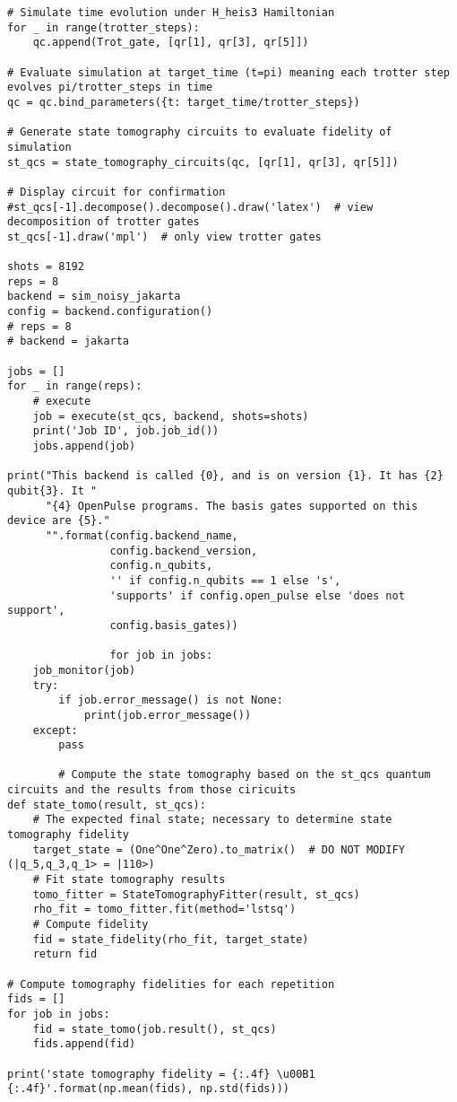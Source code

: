 \begin{verbatim}
# Simulate time evolution under H_heis3 Hamiltonian
for _ in range(trotter_steps):
    qc.append(Trot_gate, [qr[1], qr[3], qr[5]])

# Evaluate simulation at target_time (t=pi) meaning each trotter step evolves pi/trotter_steps in time
qc = qc.bind_parameters({t: target_time/trotter_steps})

# Generate state tomography circuits to evaluate fidelity of simulation
st_qcs = state_tomography_circuits(qc, [qr[1], qr[3], qr[5]])

# Display circuit for confirmation
#st_qcs[-1].decompose().decompose().draw('latex')  # view decomposition of trotter gates
st_qcs[-1].draw('mpl')  # only view trotter gates

shots = 8192
reps = 8
backend = sim_noisy_jakarta
config = backend.configuration()
# reps = 8
# backend = jakarta

jobs = []
for _ in range(reps):
    # execute
    job = execute(st_qcs, backend, shots=shots)
    print('Job ID', job.job_id())
    jobs.append(job)

print("This backend is called {0}, and is on version {1}. It has {2} qubit{3}. It "
      "{4} OpenPulse programs. The basis gates supported on this device are {5}."
      "".format(config.backend_name,
                config.backend_version,
                config.n_qubits,
                '' if config.n_qubits == 1 else 's',
                'supports' if config.open_pulse else 'does not support',
                config.basis_gates))

                for job in jobs:
    job_monitor(job)
    try:
        if job.error_message() is not None:
            print(job.error_message())
    except:
        pass

        # Compute the state tomography based on the st_qcs quantum circuits and the results from those ciricuits
def state_tomo(result, st_qcs):
    # The expected final state; necessary to determine state tomography fidelity
    target_state = (One^One^Zero).to_matrix()  # DO NOT MODIFY (|q_5,q_3,q_1> = |110>)
    # Fit state tomography results
    tomo_fitter = StateTomographyFitter(result, st_qcs)
    rho_fit = tomo_fitter.fit(method='lstsq')
    # Compute fidelity
    fid = state_fidelity(rho_fit, target_state)
    return fid

# Compute tomography fidelities for each repetition
fids = []
for job in jobs:
    fid = state_tomo(job.result(), st_qcs)
    fids.append(fid)
    
print('state tomography fidelity = {:.4f} \u00B1 {:.4f}'.format(np.mean(fids), np.std(fids)))
\end{verbatim}
